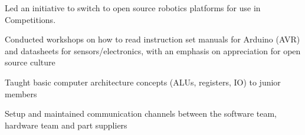 Led an initiative to switch to open source robotics platforms for use in Competitions. 
\medskip
\begin{cvitemize}
  \item Conducted workshops on how to read instruction set manuals for Arduino (AVR) and datasheets for sensors/electronics, with an emphasis on appreciation for open source culture
  \item Taught basic computer architecture concepts (ALUs, registers, IO) to junior members
  \item Setup and maintained communication channels between the software team, hardware team and part suppliers
\end{cvitemize}